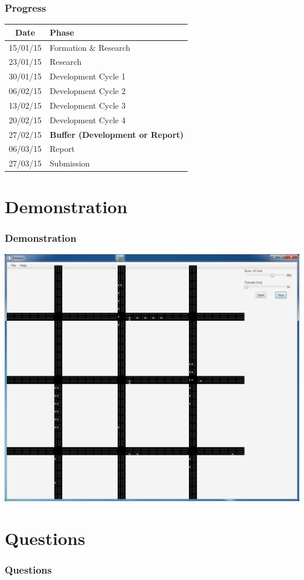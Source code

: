 \documentclass{beamer}
\begin{document}
\begin{frame}
\frametitle{Progress}


	\begin{tabular}{|c|l|}
	\hline
	\textbf{Date} & \textbf{Phase} \\ \hline
	15/01/15 & Formation \& Research \\ \hline
	23/01/15 & Research \\ \hline
	30/01/15 & Development Cycle 1 \\ \hline
	\rowcolor{LightCyan}
	06/02/15 & Development Cycle 2 \\ \hline
	13/02/15 & Development Cycle 3 \\ \hline
	20/02/15 & Development Cycle 4 \\ \hline
	27/02/15 & \textbf{Buffer (Development or Report)} \\ \hline
	06/03/15 & Report \\ \hline
	27/03/15 & Submission \\ \hline
	\end{tabular}
	
\end{frame}

\section{Demonstration}

\begin{frame}
\frametitle{Demonstration}
\includegraphics[scale=0.25]{screenshot}
\end{frame}

\section{Questions}

\begin{frame}
\frametitle{Questions}

\end{frame}
\end{document}
